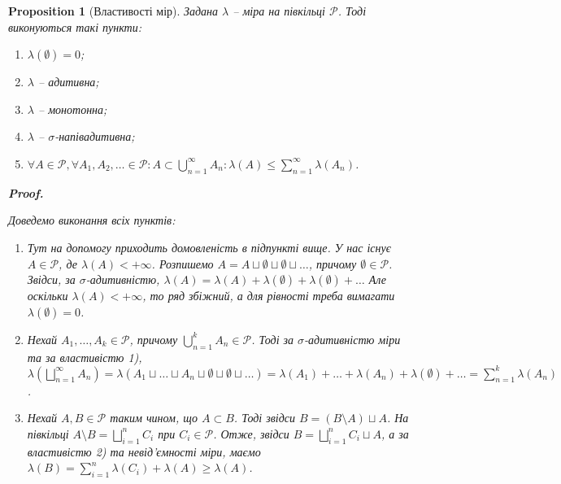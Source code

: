\documentclass[a4paper, 10pt]{article}
\makeatletter
\theoremstyle{theoremdd}
\newtheorem{proposition}[theorem]{Proposition}
\renewenvironment{proof}[1][Proof.\\]{\par
\pushQED{\hfill \qed}%
\normalfont \topsep6\p@\@plus6\p@\relax
\trivlist
\item\relax
{\bfseries
#1\@addpunct{.}}\hspace\labelsep\ignorespaces
}{%
\popQED\endtrivlist\@endpefalse
}
\makeatother
\begin{document}
\begin{proposition}[Властивості мір]
Задана $\lambda$ -- міра на півкільці $\mathcal{P}$. Тоді виконуються такі пункти:
\begin{enumerate}[nosep,wide=0pt,label={\arabic*)}]
\item $\lambda(\emptyset) = 0$;
\item $\lambda$ -- адитивна;
\item $\lambda$ -- монотонна;
\item $\lambda$ -- $\sigma$-напівадитивна;
\item $\forall A \in \mathcal{P}, \forall A_1,A_2,\dots \in \mathcal{P}: A \subset \displaystyle\bigcup_{n=1}^\infty A_n: \lambda(A) \leq \displaystyle\sum_{n=1}^\infty \lambda(A_n)$.
\end{enumerate}

\begin{proof}
Доведемо виконання всіх пунктів:
\begin{enumerate}[wide=0pt, label={\arabic*)}]
\item Тут на допомогу приходить домовленість в підпункті вище. У нас існує $A \in \mathcal{P}$, де $\lambda(A) < +\infty$. Розпишемо $A =  A \sqcup \emptyset \sqcup \emptyset \sqcup \dots$, причому $\emptyset \in \mathcal{P}$. Звідси, за $\sigma$-адитивністю, $\lambda(A) = \lambda(A) + \lambda(\emptyset) + \lambda(\emptyset) + \dots$ Але оскільки $\lambda(A) < +\infty$, то ряд збіжний, а для рівності треба вимагати $\lambda(\emptyset) = 0$.

\item Нехай $A_1,\dots,A_k \in \mathcal{P}$, причому $\displaystyle\bigcup_{n=1}^k A_n \in \mathcal{P}$. Тоді за $\sigma$-адитивністю міри та за властивістю 1),\\ $\displaystyle\lambda\left( \bigsqcup_{n=1}^\infty A_n \right) = \lambda(A_1 \sqcup \dots \sqcup A_n \sqcup \emptyset \sqcup \emptyset \sqcup \dots) = \lambda(A_1) + \dots + \lambda(A_n) + \lambda(\emptyset) + \dots = \sum_{n=1}^k \lambda(A_n)$.

\item Нехай $A,B \in \mathcal{P}$ таким чином, що $A \subset B$. Тоді звідси $B = (B \setminus A) \sqcup A$. На півкільці $A \setminus B = \displaystyle\bigsqcup_{i=1}^n C_i$ при $C_i \in \mathcal{P}$. Отже, звідси $B = \displaystyle\bigsqcup_{i=1}^n C_i \sqcup A$, а за властивістю 2) та невід'ємності міри, маємо \\ $\lambda(B) = \displaystyle\sum_{i=1}^n \lambda(C_i) + \lambda(A) \geq \lambda(A)$.


\end{enumerate}
\end{proof}
\end{proposition}
\end{document}
